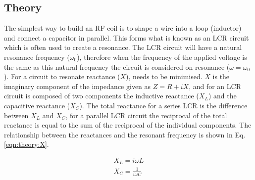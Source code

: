 \subsection{Theory}




The simplest way to build an \ac{RF} coil is to shape a wire into a loop (inductor) and connect a capacitor in parallel. This forms what is known as an LCR circuit which is often used to create a resonance. The LCR circuit will have a natural resonance frequency ($\omega_0$), therefore when the frequency of the applied voltage is the same as this natural frequency the circuit is considered on resonance ($\omega=\omega_0$). For a circuit to resonate reactance ($X$), needs to be minimised. $X$ is the imaginary component of the impedance given as $Z = R+iX$, and for an LCR circuit is composed of two components the inductive reactance ($X_L$) and the capacitive reactance ($X_C$). The total reactance for a series LCR is the difference between $X_L$ and $X_C$, for a parallel LCR circuit the reciprocal of the total reactance is equal to the sum of the reciprocal of the individual components. The relationship between the reactances and the resonant frequency is shown in Eq. \ref{eqn:theory:X}.

\begin{equation}
\begin{gathered}
    X_L = i\omega L \\
    X_C = \frac{1}{i\omega C}
    \label{eqn:theory:X}
\end{gathered}
\end{equation}

